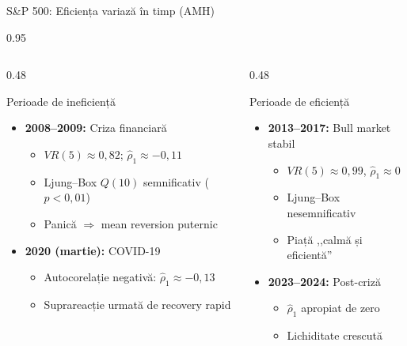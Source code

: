\documentclass[9pt, aspectratio=169, t]{beamer}
\begin{document}
\begin{frame}[shrink=15]{S\&P 500: Eficiența variază în timp (AMH)}
\begin{cminipage}{0.95\textwidth}
\begin{columns}[T]
\begin{column}{0.48\textwidth}
\begin{block}{Perioade de ineficiență}
\begin{itemize}\setlength{\itemsep}{0pt}
    \item \textbf{2008--2009:} Criza financiară
    \begin{itemize}\setlength{\itemsep}{0pt}
        \item $VR(5) \approx 0{,}82$; $\hat\rho_1 \approx -0{,}11$
        \item Ljung--Box $Q(10)$ semnificativ ($p < 0{,}01$)
        \item Panică $\Rightarrow$ mean reversion puternic
    \end{itemize}
    \item \textbf{2020 (martie):} COVID-19
    \begin{itemize}\setlength{\itemsep}{0pt}
        \item Autocorelație negativă: $\hat\rho_1 \approx -0{,}13$
        \item Suprareacție urmată de recovery rapid
    \end{itemize}
\end{itemize}
\end{block}
\end{column}
\begin{column}{0.48\textwidth}
\begin{block}{Perioade de eficiență}
\begin{itemize}\setlength{\itemsep}{0pt}
    \item \textbf{2013--2017:} Bull market stabil
    \begin{itemize}\setlength{\itemsep}{0pt}
        \item $VR(5) \approx 0{,}99$, $\hat\rho_1 \approx 0$
        \item Ljung--Box nesemnificativ
        \item Piață ,,calmă și eficientă''
    \end{itemize}
    \item \textbf{2023--2024:} Post-criză
    \begin{itemize}\setlength{\itemsep}{0pt}
        \item $\hat\rho_1$ apropiat de zero
        \item Lichiditate crescută
    \end{itemize}
\end{itemize}
\end{block}
\end{column}
\end{columns}


\end{cminipage}
\end{frame}
\end{document}
